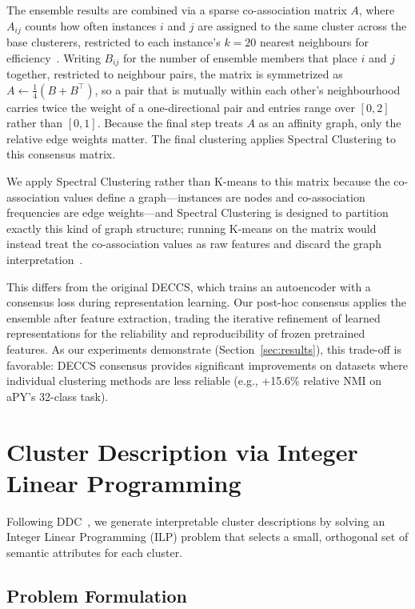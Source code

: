 The ensemble results are combined via a sparse co-association matrix $A$, where $A_{ij}$ counts how often instances $i$ and $j$ are assigned to the same cluster across the base clusterers, restricted to each instance's $k = 20$ nearest neighbours for efficiency~\citep{Fred2005}. Writing $B_{ij}$ for the number of ensemble members that place $i$ and $j$ together, restricted to neighbour pairs, the matrix is symmetrized as $A \gets \frac{1}{4}(B + B^{\top})$, so a pair that is mutually within each other's neighbourhood carries twice the weight of a one-directional pair and entries range over $[0, 2]$ rather than $[0, 1]$. Because the final step treats $A$ as an affinity graph, only the relative edge weights matter. The final clustering applies Spectral Clustering to this consensus matrix.

We apply Spectral Clustering rather than K-means to this matrix because the co-association values define a graph---instances are nodes and co-association frequencies are edge weights---and Spectral Clustering is designed to partition exactly this kind of graph structure; running K-means on the matrix would instead treat the co-association values as raw features and discard the graph interpretation~\citep{Fred2005}.

This differs from the original DECCS, which trains an autoencoder with a consensus loss during representation learning. Our post-hoc consensus applies the ensemble after feature extraction, trading the iterative refinement of learned representations for the reliability and reproducibility of frozen pretrained features. As our experiments demonstrate (Section~\ref{sec:results}), this trade-off is favorable: DECCS consensus provides significant improvements on datasets where individual clustering methods are less reliable (e.g., +15.6\% relative NMI on aPY's 32-class task).


\section{Cluster Description via Integer Linear Programming}
\label{sec:ilp}

Following DDC~\citep{Zhang2021}, we generate interpretable cluster descriptions by solving an Integer Linear Programming (ILP) problem that selects a small, orthogonal set of semantic attributes for each cluster.

\subsection{Problem Formulation}

